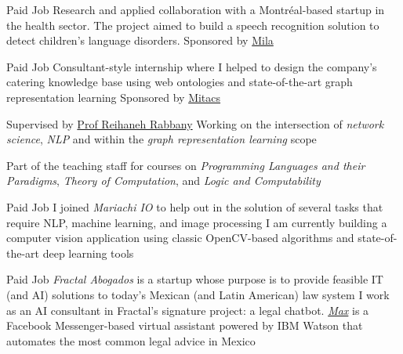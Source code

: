 \documentclass[8pt,a4paper,sans]{moderncv} %
\begin{document}
        {Paid Job}
        {Research and applied collaboration with a Montréal-based startup in the health sector.
         The project aimed to build a speech recognition solution to detect children's language disorders.}
        {Sponsored by \href{https://mila.quebec/en}{Mila}}
        {}

        {Paid Job}
        {Consultant-style internship where I helped to design the company's catering knowledge base using
         web ontologies and state-of-the-art graph representation learning}
        {Sponsored by \href{https://www.mitacs.ca/en}{Mitacs}}
        {}

        {Supervised by \href{https;//wwww.reirab.com}{Prof Reihaneh Rabbany}}
        {Working on the intersection of \emph{network science}, \emph{NLP} and within the \emph{graph representation learning} scope}
        {}
        {}

        {Part of the teaching staff for courses on \emph{Programming Languages and their Paradigms},
         \emph{Theory of Computation}, and \emph{Logic and Computability}}
        {}
        {}
        {}
        
        {Paid Job}
        {I joined \emph{Mariachi IO} to help out in the solution of several tasks that require NLP, machine learning, and image processing}
        {I am currently building a computer vision application using classic OpenCV-based algorithms and state-of-the-art deep learning tools}
        {}
        {}

        {Paid Job}
        {\emph{Fractal Abogados} is a startup whose purpose is to provide feasible IT (and AI) solutions to today's Mexican (and Latin American) law system}
        {I work as an AI consultant in Fractal's signature project: a legal chatbot. \href{https://m.me/fractal-abogados}{\emph{Max}} is a Facebook Messenger-based virtual assistant powered by IBM Watson that automates the most common legal advice in Mexico}
        {}
        {}
\end{document}
